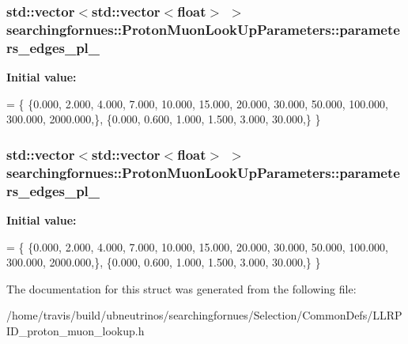 \subsubsection[{\texorpdfstring{parameters\+\_\+edges\+\_\+pl\+\_\+1}{parameters_edges_pl_1}}]{\setlength{\rightskip}{0pt plus 5cm}std\+::vector$<$std\+::vector$<$float$>$ $>$ searchingfornues\+::\+Proton\+Muon\+Look\+Up\+Parameters\+::parameters\+\_\+edges\+\_\+pl\+\_}\hypertarget{structsearchingfornues_1_1ProtonMuonLookUpParameters_ae7cd0e0596329c2e0689a31ccba5b5e4}{}\label{structsearchingfornues_1_1ProtonMuonLookUpParameters_ae7cd0e0596329c2e0689a31ccba5b5e4}
{\bfseries Initial value\+:}
\begin{DoxyCode}
= \{
    \{0.000, 2.000, 4.000, 7.000, 10.000, 15.000, 20.000, 30.000, 50.000, 100.000, 300.000, 2000.000,\},
    \{0.000, 0.600, 1.000, 1.500, 3.000, 30.000,\}
    \}
\end{DoxyCode}
\subsubsection[{\texorpdfstring{parameters\+\_\+edges\+\_\+pl\+\_\+2}{parameters_edges_pl_2}}]{\setlength{\rightskip}{0pt plus 5cm}std\+::vector$<$std\+::vector$<$float$>$ $>$ searchingfornues\+::\+Proton\+Muon\+Look\+Up\+Parameters\+::parameters\+\_\+edges\+\_\+pl\+\_}\hypertarget{structsearchingfornues_1_1ProtonMuonLookUpParameters_a0e4c9bb9727b84adaec7e643b95b062b}{}\label{structsearchingfornues_1_1ProtonMuonLookUpParameters_a0e4c9bb9727b84adaec7e643b95b062b}
{\bfseries Initial value\+:}
\begin{DoxyCode}
= \{
    \{0.000, 2.000, 4.000, 7.000, 10.000, 15.000, 20.000, 30.000, 50.000, 100.000, 300.000, 2000.000,\},
    \{0.000, 0.600, 1.000, 1.500, 3.000, 30.000,\}
    \}
\end{DoxyCode}


The documentation for this struct was generated from the following file\+:\begin{DoxyCompactItemize}
\item 
/home/travis/build/ubneutrinos/searchingfornues/\+Selection/\+Common\+Defs/L\+L\+R\+P\+I\+D\+\_\+proton\+\_\+muon\+\_\+lookup.\+h\end{DoxyCompactItemize}
